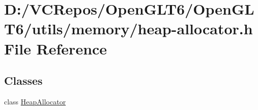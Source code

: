 \hypertarget{heap-allocator_8h}{}\section{D\+:/\+V\+C\+Repos/\+Open\+G\+L\+T6/\+Open\+G\+L\+T6/utils/memory/heap-\/allocator.h File Reference}
\label{heap-allocator_8h}
\subsection*{Classes}
\begin{DoxyCompactItemize}
\item 
class \mbox{\hyperlink{class_heap_allocator}{Heap\+Allocator}}
\end{DoxyCompactItemize}
